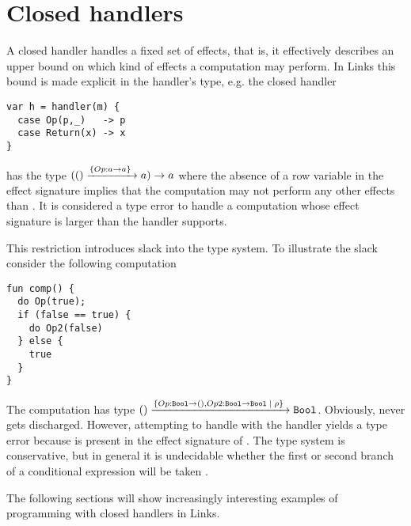 \section{Closed handlers}\label{sec:closedhandlers}
A closed handler handles a fixed set of effects, that is, it effectively describes an upper bound on which kind of effects a computation may perform. In Links this bound is made explicit in the handler's type, e.g. the closed handler 
\begin{lstlisting}[style=links]
var h = handler(m) {
  case Op(p,_)   -> p
  case Return(x) -> x
}
\end{lstlisting}
has the type $(() \xrightarrow{\left\{Op : a \to a \right\}\;} a) \to a$ where the absence of a row variable in the effect signature implies that the computation  may not perform any other effects than . It is considered a type error to handle a computation whose effect signature is larger than the handler supports. 

This restriction introduces slack into the type system. To illustrate the slack consider the following computation
\begin{lstlisting}[style=links]
fun comp() {
  do Op(true);
  if (false == true) {
    do Op2(false)
  } else { 
    true
  }
}
\end{lstlisting}
The computation  has type $() \xrightarrow{\left\{Op:\texttt{Bool} \to (),Op2:\texttt{Bool} \to \texttt{Bool} \; | \; \rho \right\}\;} \texttt{Bool}$. Obviously,  never gets discharged. However, attempting to handle  with the handler  yields a type error because  is present in the effect signature of . The type system is conservative, but in general it is undecidable whether the first or second branch of a conditional expression will be taken \cite{Huttel2010}.

The following sections will show increasingly interesting examples of programming with closed handlers in Links.

